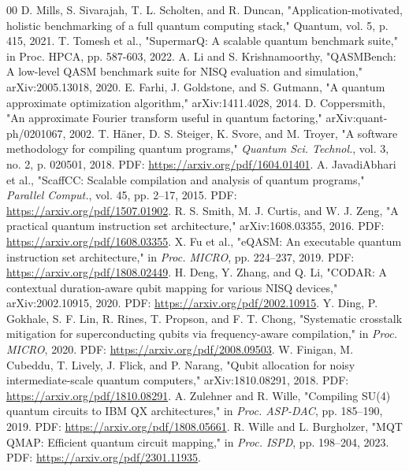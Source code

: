 \documentclass[conference]{IEEEtran}
\begin{document}
\begin{thebibliography}{00}
 D. Mills, S. Sivarajah, T. L. Scholten, and R. Duncan, "Application-motivated, holistic benchmarking of a full quantum computing stack," Quantum, vol. 5, p. 415, 2021.
 T. Tomesh et al., "SupermarQ: A scalable quantum benchmark suite," in Proc. HPCA, pp. 587-603, 2022.
 A. Li and S. Krishnamoorthy, "QASMBench: A low-level QASM benchmark suite for NISQ evaluation and simulation," arXiv:2005.13018, 2020.
 E. Farhi, J. Goldstone, and S. Gutmann, "A quantum approximate optimization algorithm," arXiv:1411.4028, 2014.
 D. Coppersmith, "An approximate Fourier transform useful in quantum factoring," arXiv:quant-ph/0201067, 2002.
 T. H\"aner, D. S. Steiger, K. Svore, and M. Troyer, "A software methodology for compiling quantum programs," \emph{Quantum Sci. Technol.}, vol. 3, no. 2, p. 020501, 2018. PDF: \url{https://arxiv.org/pdf/1604.01401}.
 A. JavadiAbhari et al., "ScaffCC: Scalable compilation and analysis of quantum programs," \emph{Parallel Comput.}, vol. 45, pp. 2--17, 2015. PDF: \url{https://arxiv.org/pdf/1507.01902}.
 R. S. Smith, M. J. Curtis, and W. J. Zeng, "A practical quantum instruction set architecture," arXiv:1608.03355, 2016. PDF: \url{https://arxiv.org/pdf/1608.03355}.
 X. Fu et al., "eQASM: An executable quantum instruction set architecture," in \emph{Proc. MICRO}, pp. 224--237, 2019. PDF: \url{https://arxiv.org/pdf/1808.02449}.
 H. Deng, Y. Zhang, and Q. Li, "CODAR: A contextual duration-aware qubit mapping for various NISQ devices," arXiv:2002.10915, 2020. PDF: \url{https://arxiv.org/pdf/2002.10915}.
 Y. Ding, P. Gokhale, S. F. Lin, R. Rines, T. Propson, and F. T. Chong, "Systematic crosstalk mitigation for superconducting qubits via frequency-aware compilation," in \emph{Proc. MICRO}, 2020. PDF: \url{https://arxiv.org/pdf/2008.09503}.
 W. Finigan, M. Cubeddu, T. Lively, J. Flick, and P. Narang, "Qubit allocation for noisy intermediate-scale quantum computers," arXiv:1810.08291, 2018. PDF: \url{https://arxiv.org/pdf/1810.08291}.
 A. Zulehner and R. Wille, "Compiling SU(4) quantum circuits to IBM QX architectures," in \emph{Proc. ASP-DAC}, pp. 185--190, 2019. PDF: \url{https://arxiv.org/pdf/1808.05661}.
 R. Wille and L. Burgholzer, "MQT QMAP: Efficient quantum circuit mapping," in \emph{Proc. ISPD}, pp. 198--204, 2023. PDF: \url{https://arxiv.org/pdf/2301.11935}.

\end{thebibliography}
\end{document}

